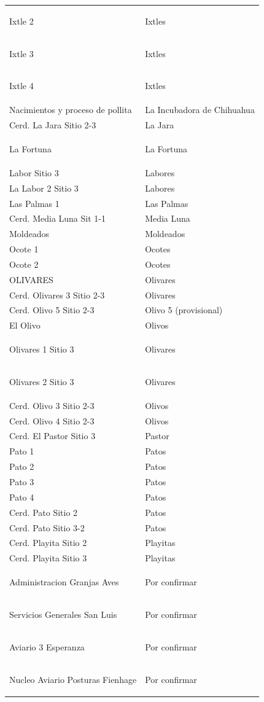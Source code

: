 \documentclass[11pt]{article}
\newcommand{\corregido}[1]{\colorbox{red!25}{\strut #1}}
\newcommand{\incorporado}[1]{\colorbox{green!25}{\strut #1}}
\newcommand{\pendiente}[1]{\colorbox{yellow!35}{\strut #1}}
\begin{document}
\begin{longtable}{@{}p{7cm}p{7cm}@{}}
\corregido{Ixtle 2} & \corregido{Ixtles} \\
\corregido{Ixtle 3} & \corregido{Ixtles} \\
\corregido{Ixtle 4} & \corregido{Ixtles} \\
Nacimientos y proceso de pollita & La Incubadora de Chihuahua \\
Cerd. La Jara Sitio 2-3 & La Jara \\
\incorporado{La Fortuna} & \incorporado{La Fortuna} \\
Labor Sitio 3 & Labores \\
La Labor 2 Sitio 3 & Labores \\
Las Palmas 1 & Las Palmas \\
Cerd. Media Luna Sit 1-1 & Media Luna \\
Moldeados & Moldeados \\
Ocote 1 & Ocotes \\
Ocote 2 & Ocotes \\
OLIVARES & Olivares \\
Cerd. Olivares 3 Sitio 2-3 & Olivares \\
Cerd. Olivo 5 Sitio 2-3 & Olivo 5 (provisional) \\
El Olivo & Olivos \\
\corregido{Olivares 1 Sitio 3} & \corregido{Olivares} \\
\corregido{Olivares 2 Sitio 3} & \corregido{Olivares} \\
Cerd. Olivo 3 Sitio 2-3 & Olivos \\
Cerd. Olivo 4 Sitio 2-3 & Olivos \\
Cerd. El Pastor Sitio 3 & Pastor \\
Pato 1 & Patos \\
Pato 2 & Patos \\
Pato 3 & Patos \\
Pato 4 & Patos \\
Cerd. Pato Sitio 2 & Patos \\
Cerd. Pato Sitio 3-2 & Patos \\
Cerd. Playita Sitio 2 & Playitas \\
Cerd. Playita Sitio 3 & Playitas \\
\pendiente{Administracion Granjas Aves} & \pendiente{Por confirmar} \\
\pendiente{Servicios Generales San Luis} & \pendiente{Por confirmar} \\
\pendiente{Aviario 3 Esperanza} & \pendiente{Por confirmar} \\
\pendiente{Nucleo Aviario Posturas Fienhage} & \pendiente{Por confirmar} \\

\end{longtable}
\end{document}
